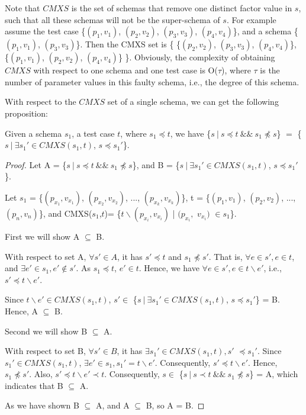 Note that $CMXS$ is the set of schemas that remove one distinct factor value in $s$, such that all these schemas will not be the super-schema of $s$. For example assume the test case \{$(p_{1}, v_{1})$, $(p_{2}, v_{2})$, $(p_{3}, v_{3})$, $(p_{4}, v_{4})$\}, and a schema \{$(p_{1}, v_{1})$, $(p_{3}, v_{3})$\}. Then the CMXS set is \{ \{$(p_{2}, v_{2})$,  $(p_{3}, v_{3})$, $(p_{4}, v_{4})$\}, \{$(p_{1}, v_{1})$,  $(p_{2}, v_{2})$, $(p_{4}, v_{4})$\} \}. Obviously, the complexity of obtaining $CMXS$ with respect to one schema and one test case is O($\tau$), where $\tau$ is the number of parameter values in this faulty schema, i.e., the degree of this schema.

With respect to the $CMXS$ set of a single schema, we can get the following proposition:


\begin{proposition}\label{pro:subofCMXS}
Given a schema $s_{1}$, a test case $t$, where $s_{1} \preceq t$, we have \{$s\ |\ s \preceq t\ \&\&\ s_{1} \npreceq s$\} $=$  \{$ s\ |\ \exists s_{1}' \in CMXS(s_{1}, t)$, $s \preceq s_{1}'$\}.
\end{proposition}

\begin{proof}

Let A =  \{$s\ |\ s \preceq t\ \&\&\ s_{1} \npreceq s$\}, and B = \{$ s\ |\ \exists s_{1}' \in CMXS(s_{1}, t)$, $s \preceq s_{1}'$\}.



Let $s_{1}$ = \{$(p_{x_{1}}, v_{x_{1}})$, $(p_{x_{2}}, v_{x_{2}})$, ..., $(p_{x_{k}}, v_{x_{k}})$\},  t = \{$(p_{1}, v_{1})$, $(p_{2}, v_{2})$, ..., $(p_{n}, v_{n})$\}, and CMXS($s_{1}$,$t$)= \{$t \backslash (p_{x_{i}}, v_{x_{i}})$ | $(p_{x_{i}},$ $v_{x_{i}})$ $ \in s_{1} $\}.

First we will show A $\subseteq$ B.

With respect to set A, $\forall s' \in A$, it has $s' \preceq t$ and $ s_{1} \npreceq s'$. That is, $\forall e \in s', e \in t$, and  $\exists e' \in s_{1}, e' \not\in s'$. As $s_{1} \preceq t$, $e' \in t$. Hence, we have $\forall e \in s', e \in t \backslash e'$, i.e., $s' \preceq t \backslash e'$.

Since $t \backslash e' \in CMXS(s_{1}, t)$,  $s' \in $ \{$ s\ |\ \exists s_{1}' \in CMXS(s_{1}, t)$, $s \preceq s_{1}'$\} = B. Hence, A $\subseteq$ B.

Second we will show B $\subseteq$ A.

With respect to set B, $\forall s' \in B$, it has $\exists s_{1}' \in CMXS(s_{1}, t), s'$ $ \preceq s_{1}'$. Since $s_{1}' \in CMXS(s_{1}, t)$, $\exists e' \in s_{1}, s_{1}' =  t \backslash e'$. Consequently, $s' \preceq t \backslash e'$. Hence, $s_{1} \npreceq s'$. Also, $s' \preceq t \backslash e' \prec t$. Consequently, $s \in $  \{$s\ |\ s \prec t\ \&\&\ s_{1} \npreceq s$\} = A, which indicates that B $\subseteq$ A.

As we have shown B $\subseteq$ A, and A $\subseteq$ B, so A = B.

\end{proof}

